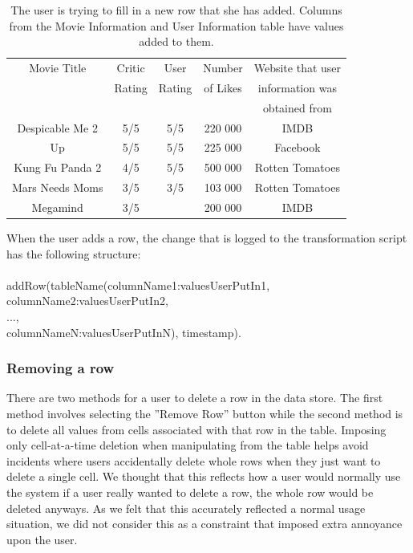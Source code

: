 \documentclass[12pt]{article}
\begin{document}
\begin{table}[!ht]
\centering
\begin{tabular}{ | c | c | c | c | c | }
 \hline
    Movie Title & Critic  & User & Number & Website that user\\
    & Rating & Rating & of Likes & information was \\
    &&&& obtained from\\ \hline \hline
    Despicable Me 2 & 5/5 & 5/5 & 220 000 & IMDB\\ \hline
    Up & 5/5 & 5/5 & 225 000 & Facebook\\ \hline
    Kung Fu Panda 2 & 4/5 & 5/5 & 500 000 & Rotten Tomatoes\\ \hline
    Mars Needs Moms & 3/5 & 3/5 & 103 000 & Rotten Tomatoes\\ \hline
    Megamind & 3/5 & & 200 000 & IMDB \\
    \hline
\end{tabular}
\caption{The user is trying to fill in a new row that she has added. Columns from the Movie Information and User Information table have values added to them.}
\label{table:add_row_table_example3}
\end{table}

When the user adds a row, the change that is logged to the transformation script has the following structure: \\ \\
addRow(tableName(columnName1:valuesUserPutIn1, \\
 \indent columnName2:valuesUserPutIn2, \\
 \indent ..., \\
 \indent columnNameN:valuesUserPutInN), timestamp).

\subsubsection{Removing a row}
\label{sec:remove_row}
There are two methods for a user to delete a row in the data store. The first method involves selecting the ''Remove Row'' button while the second method is to delete all values from cells associated with that row in the table. Imposing only cell-at-a-time deletion when manipulating from the table helps avoid incidents where users accidentally delete whole rows when they just want to delete a single cell. We thought that this reflects how a user would normally use the system \textemdash if a user really wanted to delete a row, the whole row would be deleted anyways. As we felt that this accurately reflected a normal usage situation, we did not consider this as a constraint that imposed extra annoyance upon the user.
\end{document}

